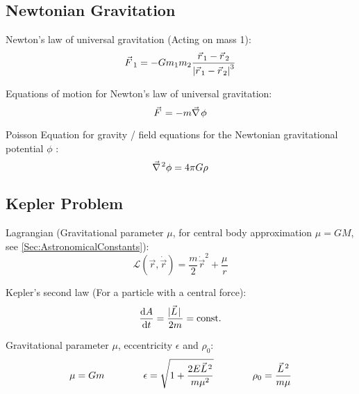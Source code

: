 	\subsection{Newtonian Gravitation}
		\noindent
		Newton's law of universal gravitation (Acting on mass 1):
		\begin{equation}
			\vec{F}_1 = - G m_1 m_2 \frac{\vec{r}_1-\vec{r}_2}{\abs{\vec{r}_1-\vec{r}_2}^3}
		\end{equation}

		\noindent
		Equations of motion for Newton's law of universal gravitation:
		\begin{equation}
			\vec{F}=-m\Nabla\phi
		\end{equation}

		\noindent
		Poisson Equation for gravity / field equations for the Newtonian gravitational potential $\phi$ :
		\begin{equation}
			\Nabla^2\phi = 4\pi G\rho
		\end{equation}


	\subsection{Kepler Problem}
		\noindent
		Lagrangian (Gravitational parameter $\mu$, for central body approximation $\mu=GM$, see \ref{Sec:AstronomicalConstants}):
		\begin{equation}
			\mathcal{L}(\vec{r},\dot{\vec{r}}) = \frac{m}{2} \dot{\vec{r}}^2 + \frac{\mu}{r}
		\end{equation}

		\noindent
		Kepler's second law (For a particle with a central force):
		\begin{equation}
			\dv{A}{t} = \frac{\abs*{\vec{L}}}{2 m} = \const
		\end{equation}

		\noindent
		Gravitational parameter  $\mu$, eccentricity $\epsilon$ and $\rho_0$:
		\begin{equation}
			\begin{aligned}
				\mu &= G m &\hsp
				\epsilon &= \sqrt{1+\frac{2 E \vec{L}^2}{m \mu^2}} &\hsp
				\rho_0 &= \frac{\vec{L}^2}{m\mu} \\
			\end{aligned}
		\end{equation}

